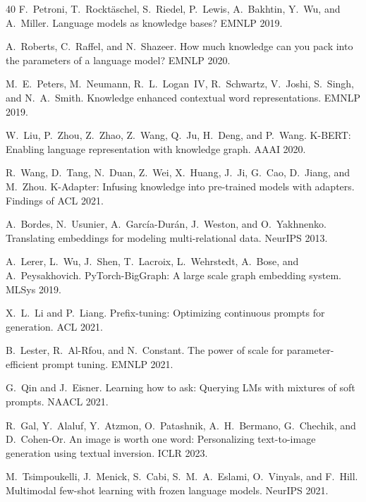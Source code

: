 \documentclass{article}
\begin{document}
\begin{thebibliography}{40}
 F.~Petroni, T.~Rockt\"{a}schel, S.~Riedel, P.~Lewis, A.~Bakhtin, Y.~Wu, and
  A.~Miller.
\newblock Language models as knowledge bases?
\newblock EMNLP 2019.

 A.~Roberts, C.~Raffel, and N.~Shazeer.
\newblock How much knowledge can you pack into the parameters of a language model?
\newblock EMNLP 2020.

 M.~E.~Peters, M.~Neumann, R.~L.~Logan~IV, R.~Schwartz, V.~Joshi, S.~Singh,
  and N.~A.~Smith.
\newblock Knowledge enhanced contextual word representations.
\newblock EMNLP 2019.

 W.~Liu, P.~Zhou, Z.~Zhao, Z.~Wang, Q.~Ju, H.~Deng, and P.~Wang.
\newblock K-BERT: Enabling language representation with knowledge graph.
\newblock AAAI 2020.

 R.~Wang, D.~Tang, N.~Duan, Z.~Wei, X.~Huang, J.~Ji, G.~Cao, D.~Jiang, and
  M.~Zhou.
\newblock K-Adapter: Infusing knowledge into pre-trained models with adapters.
\newblock Findings of ACL 2021.

 A.~Bordes, N.~Usunier, A.~Garc\'{i}a-Dur\'{a}n, J.~Weston, and O.~Yakhnenko.
\newblock Translating embeddings for modeling multi-relational data.
\newblock NeurIPS 2013.

 A.~Lerer, L.~Wu, J.~Shen, T.~Lacroix, L.~Wehrstedt, A.~Bose, and
  A.~Peysakhovich.
\newblock PyTorch-BigGraph: A large scale graph embedding system.
\newblock MLSys 2019.

 X.~L.~Li and P.~Liang.
\newblock Prefix-tuning: Optimizing continuous prompts for generation.
\newblock ACL 2021.

 B.~Lester, R.~Al-Rfou, and N.~Constant.
\newblock The power of scale for parameter-efficient prompt tuning.
\newblock EMNLP 2021.

 G.~Qin and J.~Eisner.
\newblock Learning how to ask: Querying LMs with mixtures of soft prompts.
\newblock NAACL 2021.

 R.~Gal, Y.~Alaluf, Y.~Atzmon, O.~Patashnik, A.~H.~Bermano,
  G.~Chechik, and D.~Cohen-Or.
\newblock An image is worth one word: Personalizing text-to-image generation using textual
  inversion.
\newblock ICLR 2023.

 M.~Tsimpoukelli, J.~Menick, S.~Cabi, S.~M.~A.~Eslami, O.~Vinyals, and
  F.~Hill.
\newblock Multimodal few-shot learning with frozen language models.
\newblock NeurIPS 2021.


\end{thebibliography}
\end{document}
